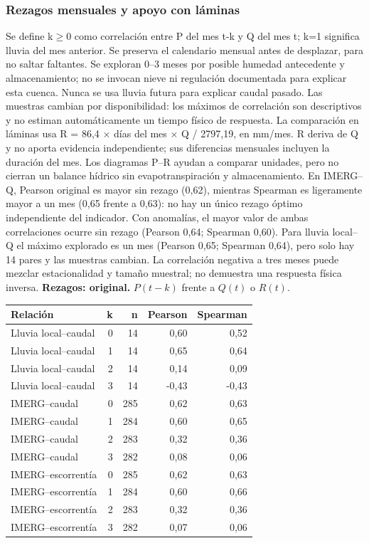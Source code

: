 \documentclass[10pt,a4paper]{article}
\begin{document}
\subsubsection*{Rezagos mensuales y apoyo con láminas}
Se define k$\geq$0 como correlación entre P del mes t-k y Q del mes t; k=1 significa lluvia del mes anterior. Se preserva el calendario mensual antes de desplazar, para no saltar faltantes. Se exploran 0--3 meses por posible humedad antecedente y almacenamiento; no se invocan nieve ni regulación documentada para explicar esta cuenca. Nunca se usa lluvia futura para explicar caudal pasado. Las muestras cambian por disponibilidad: los máximos de correlación son descriptivos y no estiman automáticamente un tiempo físico de respuesta. La comparación en láminas usa R = 86,4 $\times$ días del mes $\times$ Q / 2797,19, en mm/mes. R deriva de Q y no aporta evidencia independiente; sus diferencias mensuales incluyen la duración del mes. Los diagramas P--R ayudan a comparar unidades, pero no cierran un balance hídrico sin evapotranspiración y almacenamiento. En IMERG--Q, Pearson original es mayor sin rezago (0,62), mientras Spearman es ligeramente mayor a un mes (0,65 frente a 0,63): no hay un único rezago óptimo independiente del indicador. Con anomalías, el mayor valor de ambas correlaciones ocurre sin rezago (Pearson 0,64; Spearman 0,60). Para lluvia local--Q el máximo explorado es un mes (Pearson 0,65; Spearman 0,64), pero solo hay 14 pares y las muestras cambian. La correlación negativa a tres meses puede mezclar estacionalidad y tamaño muestral; no demuestra una respuesta física inversa.
\textbf{Rezagos: original.} $P(t-k)$ frente a $Q(t)$ o $R(t)$.
\begin{center}\small\begin{tabular}{lrrrr}\hline
Relación & k & n & Pearson & Spearman \\ \hline
Lluvia local--caudal & 0 & 14 & 0,60 & 0,52 \\
Lluvia local--caudal & 1 & 14 & 0,65 & 0,64 \\
Lluvia local--caudal & 2 & 14 & 0,14 & 0,09 \\
Lluvia local--caudal & 3 & 14 & -0,43 & -0,43 \\
IMERG--caudal & 0 & 285 & 0,62 & 0,63 \\
IMERG--caudal & 1 & 284 & 0,60 & 0,65 \\
IMERG--caudal & 2 & 283 & 0,32 & 0,36 \\
IMERG--caudal & 3 & 282 & 0,08 & 0,06 \\
IMERG--escorrentía & 0 & 285 & 0,62 & 0,63 \\
IMERG--escorrentía & 1 & 284 & 0,60 & 0,66 \\
IMERG--escorrentía & 2 & 283 & 0,32 & 0,36 \\
IMERG--escorrentía & 3 & 282 & 0,07 & 0,06 \\
\hline\end{tabular}\end{center}
\end{document}
